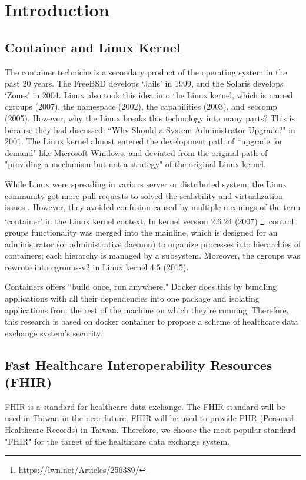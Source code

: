 \section{Introduction}

\subsection{Container and Linux Kernel}

The container techniche is a secondary product of the operating system in the past 20 years.
The FreeBSD develops `Jails' in 1999, and the Solaris develops `Zones' in 2004.
Linux also took this idea into the Linux kernel, which is named cgroups (2007),
the namespace (2002), the capabilities (2003), and seccomp (2005). However, why the Linux breaks this
technology into many parts? This is because they had discussed:
``Why Should a System Administrator Upgrade?" in 2001.
The Linux kernel almost entered the development path of ``upgrade for demand" like
Microsoft Windows, and deviated from the original path of "providing a mechanism
but not a strategy" of the original Linux kernel.

While Linux were spreading in various server or distributed system, the
Linux community got more pull requests to solved the scalability and virtualization
issues \cite{267148}. However, they avoided confusion caused by multiple meanings of
the term `container' in the Linux kernel context. In kernel version 2.6.24 (2007)
\footnote{\url{https://lwn.net/Articles/256389/}},
control groups functionality was merged into the mainline,
which is designed for an administrator (or administrative daemon) to organize processes
into hierarchies of containers; each hierarchy is managed by a subsystem. Moreover, the
cgroups was rewrote into cgroups-v2 in Linux kernel 4.5 (2015).

Containers offers ``build once, run anywhere." Docker does this by bundling
applications with all their dependencies into one package and isolating applications
from the rest of the machine on which they're running. Therefore, this research
is based on docker container to propose a scheme of healthcare data exchange system's
security.

\subsection{Fast Healthcare Interoperability Resources (FHIR)}
FHIR is a standard for healthcare data exchange. The FHIR standard will be used in
Taiwan in the near future. FHIR will be used to provide PHR (Personal Healthcare Records)
in Taiwan. Therefore, we choose the most popular standard "FHIR" for the target of
the healthcare data exchange system.

